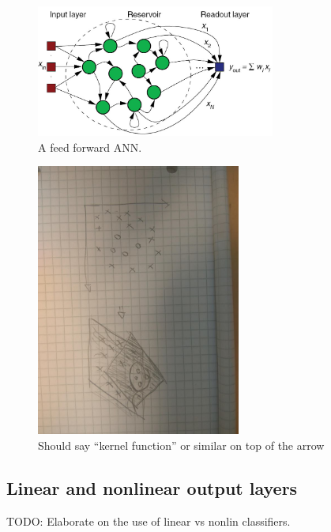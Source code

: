 \begin{figure}[h!]
  \centering
  \includegraphics[width=0.7\textwidth]{fig/RC.jpg}
  \caption{A feed forward ANN.}
  \label{figRC}
\end{figure}
\begin{figure}[h!]
  \centering
  \includegraphics[width=0.6\textwidth, angle =90]{fig/transform.jpg}
  \caption{Should say ``kernel function'' or similar on top of the arrow}
  \label{figSVM}
\end{figure}
\subsection{Linear and nonlinear output layers}
TODO: Elaborate on the use of linear vs nonlin classifiers.

\cleardoublepage

